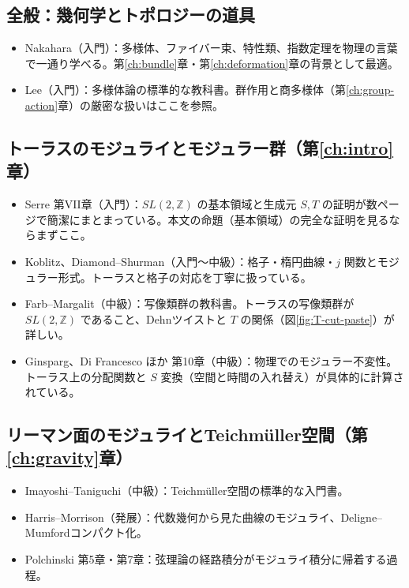 \documentclass[uplatex, dvipdfmx, book]{jsbook}
\let\origsubsection\subsection
\let\origsubsubsection\subsubsection
\renewcommand{\section}{\origsubsection}
\renewcommand{\subsection}{\origsubsubsection}
\renewcommand{\subsubsection}{\paragraph}
\begin{document}
\section*{全般：幾何学とトポロジーの道具}
\begin{itemize}
    \item Nakahara\cite{nakahara2003}（入門）：多様体、ファイバー束、特性類、指数定理を物理の言葉で一通り学べる。第\ref{ch:bundle}章・第\ref{ch:deformation}章の背景として最適。
    \item Lee\cite{lee2013}（入門）：多様体論の標準的な教科書。群作用と商多様体（第\ref{ch:group-action}章）の厳密な扱いはここを参照。
\end{itemize}

\section*{トーラスのモジュライとモジュラー群（第\ref{ch:intro}章）}
\begin{itemize}
    \item Serre\cite{serre1973} 第VII章（入門）：$SL(2,\mathbb{Z})$ の基本領域と生成元 $S, T$ の証明が数ページで簡潔にまとまっている。本文の命題（基本領域）の完全な証明を見るならまずここ。
    \item Koblitz\cite{koblitz1993}、Diamond--Shurman\cite{diamondshurman2005}（入門〜中級）：格子・楕円曲線・$j$ 関数とモジュラー形式。トーラスと格子の対応を丁寧に扱っている。
    \item Farb--Margalit\cite{farbmargalit2012}（中級）：写像類群の教科書。トーラスの写像類群が $SL(2,\mathbb{Z})$ であること、Dehnツイストと $T$ の関係（図\ref{fig:T-cut-paste}）が詳しい。
    \item Ginsparg\cite{ginsparg1988}、Di Francesco ほか\cite{difrancesco1997} 第10章（中級）：物理でのモジュラー不変性。トーラス上の分配関数と $S$ 変換（空間と時間の入れ替え）が具体的に計算されている。
\end{itemize}

\section*{リーマン面のモジュライとTeichm\"uller空間（第\ref{ch:gravity}章）}
\begin{itemize}
    \item Imayoshi--Taniguchi\cite{imayoshitaniguchi1992}（中級）：Teichm\"uller空間の標準的な入門書。
    \item Harris--Morrison\cite{harrismorrison1998}（発展）：代数幾何から見た曲線のモジュライ、Deligne--Mumfordコンパクト化。
    \item Polchinski\cite{polchinskistringtheoryvolume12005} 第5章・第7章：弦理論の経路積分がモジュライ積分に帰着する過程。
\end{itemize}
\end{document}
